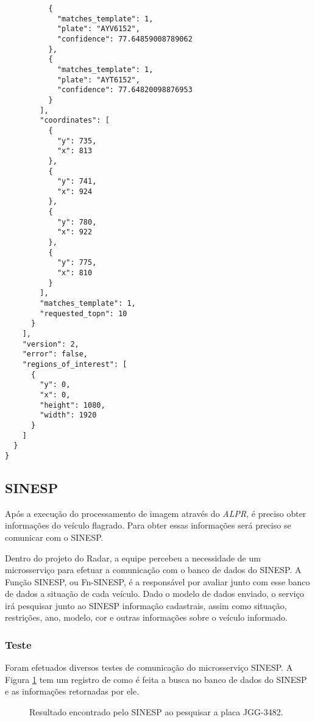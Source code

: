 \begin{lstlisting}
          {
            "matches_template": 1,
            "plate": "AYV6152",
            "confidence": 77.64859008789062
          },
          {
            "matches_template": 1,
            "plate": "AYT6152",
            "confidence": 77.64820098876953
          }
        ],
        "coordinates": [
          {
            "y": 735,
            "x": 813
          },
          {
            "y": 741,
            "x": 924
          },
          {
            "y": 780,
            "x": 922
          },
          {
            "y": 775,
            "x": 810
          }
        ],
        "matches_template": 1,
        "requested_topn": 10
      }
    ],
    "version": 2,
    "error": false,
    "regions_of_interest": [
      {
        "y": 0,
        "x": 0,
        "height": 1080,
        "width": 1920
      }
    ]
  }
}
\end{lstlisting}

\subsection{SINESP}

Após a execução do processamento de imagem através do \textit{ALPR}, é preciso obter informações do veículo flagrado. Para obter essas informações será preciso se comunicar com o SINESP.

Dentro do projeto do Radar, a equipe percebeu a necessidade de um microsserviço para efetuar a comunicação com o banco de dados do SINESP. A Função SINESP, ou Fn-SINESP, é a responsável por avaliar junto com esse banco de dados a situação de cada veículo. Dado o modelo de dados enviado, o serviço irá pesquisar junto ao SINESP informação cadastrais, assim como situação, restrições, ano, modelo, cor e outras informações sobre o veículo informado.

\subsubsection{Teste}

Foram efetuados diversos testes de comunicação do microsserviço SINESP. A Figura \ref{fig:sinesp} tem um registro de como é feita a busca no banco de dados do SINESP e as informações retornadas por ele.

\begin{figure}[H]
	\caption{\label{fig:sinesp} Resultado encontrado pelo SINESP ao pesquisar a placa JGG-3482.}
\end{figure}

